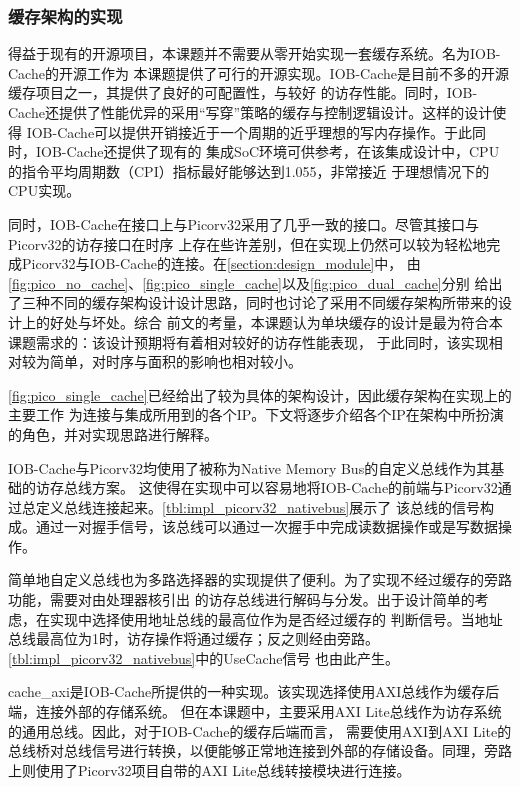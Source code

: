 \subsubsection{缓存架构的实现}

得益于现有的开源项目，本课题并不需要从零开始实现一套缓存系统。名为IOB-Cache的开源工作\cite{roque2021iob}为
本课题提供了可行的开源实现。IOB-Cache是目前不多的开源缓存项目之一，其提供了良好的可配置性，与较好
的访存性能。同时，IOB-Cache还提供了性能优异的采用“写穿”策略的缓存与控制逻辑设计。这样的设计使得
IOB-Cache可以提供开销接近于一个周期的近乎理想的写内存操作。于此同时，IOB-Cache还提供了现有的
集成SoC环境可供参考，在该集成设计中，CPU的指令平均周期数（CPI）指标最好能够达到1.055，非常接近
于理想情况下的CPU实现。

同时，IOB-Cache在接口上与Picorv32采用了几乎一致的接口。尽管其接口与Picorv32的访存接口在时序
上存在些许差别，但在实现上仍然可以较为轻松地完成Picorv32与IOB-Cache的连接。在\autoref{section:design_module}中，
由\autoref{fig:pico_no_cache}、\autoref{fig:pico_single_cache}以及\autoref{fig:pico_dual_cache}分别
给出了三种不同的缓存架构设计设计思路，同时也讨论了采用不同缓存架构所带来的设计上的好处与坏处。综合
前文的考量，本课题认为单块缓存的设计是最为符合本课题需求的：该设计预期将有着相对较好的访存性能表现，
于此同时，该实现相对较为简单，对时序与面积的影响也相对较小。

\autoref{fig:pico_single_cache}已经给出了较为具体的架构设计，因此缓存架构在实现上的主要工作
为连接与集成所用到的各个IP。下文将逐步介绍各个IP在架构中所扮演的角色，并对实现思路进行解释。

IOB-Cache与Picorv32均使用了被称为Native Memory Bus的自定义总线作为其基础的访存总线方案。
这使得在实现中可以容易地将IOB-Cache的前端与Picorv32通过总定义总线连接起来。\autoref{tbl:impl_picorv32_nativebus}展示了
该总线的信号构成。通过一对握手信号，该总线可以通过一次握手中完成读数据操作或是写数据操作。

简单地自定义总线也为多路选择器的实现提供了便利。为了实现不经过缓存的旁路功能，需要对由处理器核引出
的访存总线进行解码与分发。出于设计简单的考虑，在实现中选择使用地址总线的最高位作为是否经过缓存的
判断信号。当地址总线最高位为1时，访存操作将通过缓存；反之则经由旁路。\autoref{tbl:impl_picorv32_nativebus}中的UseCache信号
也由此产生。

cache\_axi是IOB-Cache所提供的一种实现。该实现选择使用AXI总线作为缓存后端，连接外部的存储系统。
但在本课题中，主要采用AXI Lite总线作为访存系统的通用总线。因此，对于IOB-Cache的缓存后端而言，
需要使用AXI到AXI Lite的总线桥对总线信号进行转换，以便能够正常地连接到外部的存储设备。同理，旁路
上则使用了Picorv32项目自带的AXI Lite总线转接模块进行连接。

